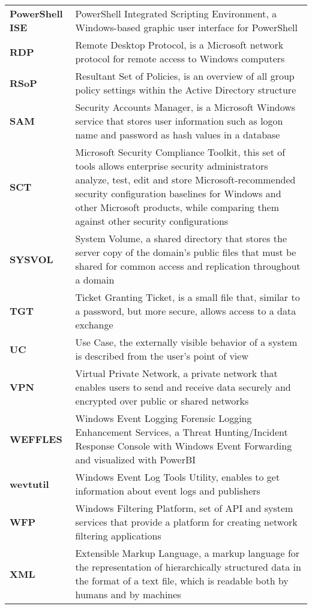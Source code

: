 \begin{longtable}{ p{4cm}  p{12cm} }
    \textbf{PowerShell ISE} & PowerShell Integrated Scripting Environment, a Windows-based graphic user interface for PowerShell\\
    \textbf{RDP} & Remote Desktop Protocol, is a Microsoft network protocol for remote access to Windows computers\\
    \textbf{RSoP} & Resultant Set of Policies, is an overview of all group policy settings within the Active Directory structure\\
    \textbf{SAM} & Security Accounts Manager, is a Microsoft Windows service that stores user information such as logon name and password as hash values in a database\\
    \textbf{SCT} & Microsoft Security Compliance Toolkit, this set of tools allows enterprise security administrators analyze, test, edit and store Microsoft-recommended security configuration baselines for Windows and other Microsoft products, while comparing them against other security configurations\\
    \textbf{SYSVOL} & System Volume, a shared directory that stores the server copy of the domain's public files that must be shared for common access and replication throughout a domain\\
    \textbf{TGT} & Ticket Granting Ticket, is a small file that, similar to a password, but more secure, allows access to a data exchange\\
    \textbf{UC} & Use Case, the externally visible behavior of a system is described from the user's point of view\\
    \textbf{VPN} & Virtual Private Network, a private network that enables users to send and receive data securely and encrypted over public or shared networks\\
    \textbf{WEFFLES} & Windows Event Logging Forensic Logging Enhancement Services, a Threat Hunting/Incident Response Console with Windows Event Forwarding and visualized with PowerBI\\
    \textbf{wevtutil} & Windows Event Log Tools Utility, enables to get information about event logs and publishers\\
    \textbf{WFP} & Windows Filtering Platform,  set of API and system services that provide a platform for creating network filtering applications\\
    \textbf{XML} & Extensible Markup Language,  a markup language for the representation of hierarchically structured data in the format of a text file, which is readable both by humans and by machines\\
\end{longtable}